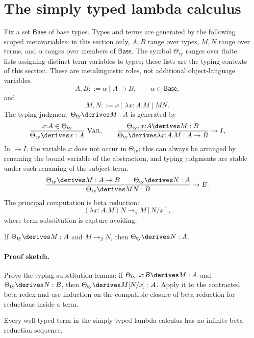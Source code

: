 \section{The simply typed lambda calculus}
\label{sec:normalization-curry-howard-02}

Fix a set \(\mathsf{Base}\) of base types.  Types and terms are generated by
the following scoped metavariables: in this section only, \(A,B\) range over
types, \(M,N\) range over terms, and \(\alpha\) ranges over members of
\(\mathsf{Base}\).  The symbol \(\Theta_{\mathrm{ty}}\) ranges over finite
lists assigning distinct term variables to types; these lists are the typing
contexts of this section.  These are metalinguistic roles, not additional
object-language variables.
\[
  A,B::=\alpha\mid A\to B,
  \qquad \alpha\in\mathsf{Base},
\]
and
\[
  M,N::=x\mid \lambda x{:}A.M\mid MN.
\]
The typing judgment \(\Theta_{\mathrm{ty}}\derives M:A\) is generated by
\[
\frac{x{:}A\in\Theta_{\mathrm{ty}}}
     {\Theta_{\mathrm{ty}}\derives x:A}\;\textsc{Var},
\qquad
\frac{\Theta_{\mathrm{ty}},x{:}A\derives M:B}
     {\Theta_{\mathrm{ty}}\derives\lambda x{:}A.M:A\to B}
     \;\textsc{\(\to I\)},
\]
In \textsc{\(\to I\)}, the variable \(x\) does not occur in
\(\Theta_{\mathrm{ty}}\); this can always be arranged by renaming the
bound variable of the abstraction, and typing judgments are stable under
such renaming of the subject term.
\[
\frac{\Theta_{\mathrm{ty}}\derives M:A\to B
      \qquad
      \Theta_{\mathrm{ty}}\derives N:A}
     {\Theta_{\mathrm{ty}}\derives MN:B}\;\textsc{\(\to E\)}.
\]
The principal computation is beta reduction:
\[
  (\lambda x{:}A.M)N\longrightarrow_\beta M[N/x],
\]
where term substitution is capture-avoiding.

\begin{theorem}
If \(\Theta_{\mathrm{ty}}\derives M:A\) and
\(M\longrightarrow_\beta N\), then
\(\Theta_{\mathrm{ty}}\derives N:A\).
\end{theorem}

\paragraph{Proof sketch.}
Prove the typing substitution lemma: if
\(\Theta_{\mathrm{ty}},x{:}B\derives M:A\) and
\(\Theta_{\mathrm{ty}}\derives N:B\), then
\(\Theta_{\mathrm{ty}}\derives M[N/x]:A\).  Apply it to the contracted beta
redex and use induction on the compatible closure of beta reduction for
reductions inside a term.

\begin{theorem}
Every well-typed term in the simply typed lambda calculus has no infinite
beta-reduction sequence.
\end{theorem}

